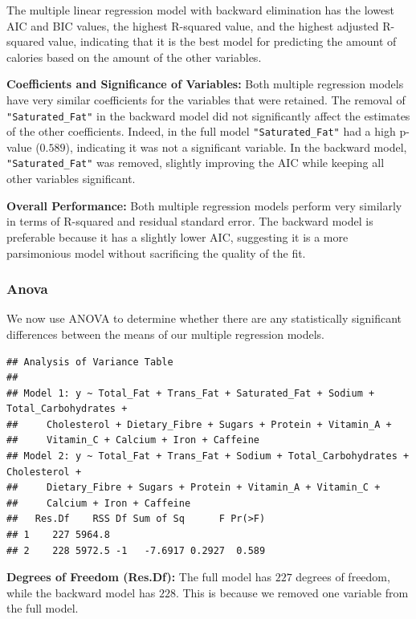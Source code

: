 \documentclass[
]{article}
\begin{document}
The multiple linear regression model with backward elimination has the
lowest AIC and BIC values, the highest R-squared value, and the highest
adjusted R-squared value, indicating that it is the best model for
predicting the amount of calories based on the amount of the other
variables.

\textbf{Coefficients and Significance of Variables:} Both multiple
regression models have very similar coefficients for the variables that
were retained. The removal of \texttt{"Saturated\_Fat"} in the backward
model did not significantly affect the estimates of the other
coefficients. Indeed, in the full model \texttt{"Saturated\_Fat"} had a
high p-value (\(0.589\)), indicating it was not a significant variable.
In the backward model, \texttt{"Saturated\_Fat"} was removed, slightly
improving the AIC while keeping all other variables significant.

\textbf{Overall Performance:} Both multiple regression models perform
very similarly in terms of R-squared and residual standard error. The
backward model is preferable because it has a slightly lower AIC,
suggesting it is a more parsimonious model without sacrificing the
quality of the fit.

\subsubsection{Anova}\label{anova}

We now use ANOVA to determine whether there are any statistically
significant differences between the means of our multiple regression
models.

\begin{verbatim}
## Analysis of Variance Table
## 
## Model 1: y ~ Total_Fat + Trans_Fat + Saturated_Fat + Sodium + Total_Carbohydrates + 
##     Cholesterol + Dietary_Fibre + Sugars + Protein + Vitamin_A + 
##     Vitamin_C + Calcium + Iron + Caffeine
## Model 2: y ~ Total_Fat + Trans_Fat + Sodium + Total_Carbohydrates + Cholesterol + 
##     Dietary_Fibre + Sugars + Protein + Vitamin_A + Vitamin_C + 
##     Calcium + Iron + Caffeine
##   Res.Df    RSS Df Sum of Sq      F Pr(>F)
## 1    227 5964.8                           
## 2    228 5972.5 -1   -7.6917 0.2927  0.589
\end{verbatim}

\textbf{Degrees of Freedom (Res.Df):} The full model has \(227\) degrees
of freedom, while the backward model has \(228\). This is because we
removed one variable from the full model.
\end{document}
